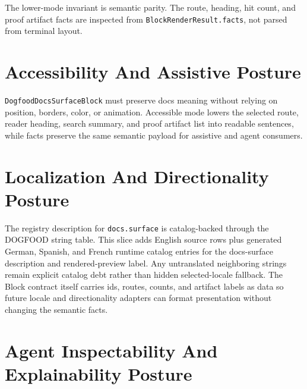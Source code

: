 The lower-mode invariant is semantic parity. The route, heading, hit count, and proof artifact facts are inspected from \texttt{B\allowbreak{}l\allowbreak{}o\allowbreak{}c\allowbreak{}k\allowbreak{}R\allowbreak{}e\allowbreak{}n\allowbreak{}d\allowbreak{}e\allowbreak{}r\allowbreak{}R\allowbreak{}e\allowbreak{}s\allowbreak{}u\allowbreak{}l\allowbreak{}t\allowbreak{}.\allowbreak{}f\allowbreak{}a\allowbreak{}c\allowbreak{}t\allowbreak{}s}, not parsed from terminal layout.

\section{Accessibility And Assistive Posture}\label{record-091-accessibility-and-assistive-posture}

\texttt{D\allowbreak{}o\allowbreak{}g\allowbreak{}f\allowbreak{}o\allowbreak{}o\allowbreak{}d\allowbreak{}D\allowbreak{}o\allowbreak{}c\allowbreak{}s\allowbreak{}S\allowbreak{}u\allowbreak{}r\allowbreak{}f\allowbreak{}a\allowbreak{}c\allowbreak{}e\allowbreak{}B\allowbreak{}l\allowbreak{}o\allowbreak{}c\allowbreak{}k} must preserve docs meaning without relying on position, borders, color, or animation. Accessible mode lowers the selected route, reader heading, search summary, and proof artifact list into readable sentences, while facts preserve the same semantic payload for assistive and agent consumers.

\section{Localization And Directionality Posture}\label{record-091-localization-and-directionality-posture}

The registry description for \texttt{d\allowbreak{}o\allowbreak{}c\allowbreak{}s\allowbreak{}.\allowbreak{}s\allowbreak{}u\allowbreak{}r\allowbreak{}f\allowbreak{}a\allowbreak{}c\allowbreak{}e} is catalog-backed through the DOGFOOD string table. This slice adds English source rows plus generated German, Spanish, and French runtime catalog entries for the docs-surface description and rendered-preview label. Any untranslated neighboring strings remain explicit catalog debt rather than hidden selected-locale fallback. The Block contract itself carries ids, routes, counts, and artifact labels as data so future locale and directionality adapters can format presentation without changing the semantic facts.

\section{Agent Inspectability And Explainability Posture}\label{record-091-agent-inspectability-and-explainability-posture}

